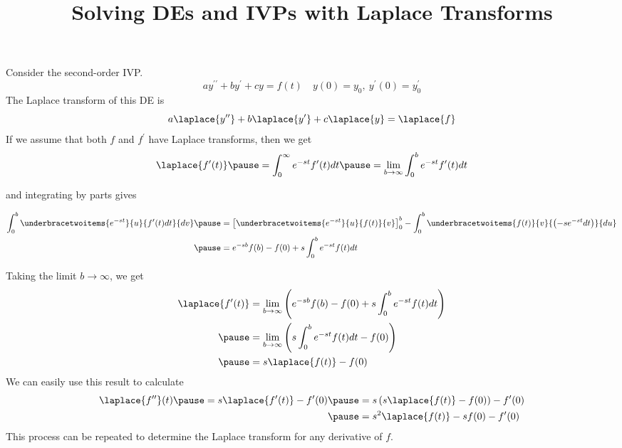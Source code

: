 \documentclass{beamer}
\title[MATH 2250 - Section 8.2]{Solving DEs and IVPs with Laplace Transforms}
\begin{document}
\begin{frame}
  \titlepage
\end{frame}

\begin{frame}
\begin{block}{}
Consider the second-order IVP\@.
\begin{equation*}
a y^{\prime\prime}+b y^{\prime}+c y=f(t)
\quad
y(0)=y_0,~y^{\prime}(0)=y^\prime_0
\end{equation*}\pause
The Laplace transform of this DE is
\begin{equation*}
a\laplace\{y^{\prime\prime}\}+b\laplace\{y^\prime\}+c\laplace\{y\}=\laplace\{f\}
\end{equation*}\pause
If we assume that both $f$ and $f^\prime$ have Laplace transforms, then we get
\begin{equation*}
\laplace\{f^\prime(t)\}\pause
=\int_0^\infty e^{-st} f^\prime(t) dt\pause
=\lim_{b\rightarrow\infty} \int_0^b e^{-st} f^\prime(t) dt
\end{equation*}\pause

\vspace{-4mm}
and integrating by parts gives

\vspace{-2mm}
\begin{equation*}
\begin{aligned}
\int_0^b \underbracetwoitems{e^{-st}}{u}{f^\prime(t) dt}{dv}\pause
&={\left[\underbracetwoitems{e^{-st}}{u}{f(t)}{v}\right]}^b_0
-\int_0^b\underbracetwoitems{f(t)}{v}{\left(-s e^{-st} dt\right)}{du}\\\pause
&=e^{-sb} f(b) - f(0) + s\int_0^b e^{-st} f(t) dt
\end{aligned}
\end{equation*}
\end{block}
\end{frame}

\begin{frame}
\begin{block}{}
Taking the limit $b \rightarrow \infty$, we get
\begin{equation*}
\begin{aligned}
\laplace\{f^\prime (t)\} &= \lim_{b\rightarrow\infty} \left(e^{-sb} f(b) - f(0) + s\int_0^b e^{-st} f(t) dt\right)\\\pause
&= \lim_{b\rightarrow\infty} \left(s\int_0^b e^{-st} f(t) dt-f(0)\right)\\\pause
&=s\laplace\{f(t)\}-f(0)
\end{aligned}
\end{equation*}\pause
We can easily use this result to calculate
\begin{equation*}
\begin{aligned}
\laplace\{f^{\prime\prime}\}(t)\pause
=s\laplace\{f^\prime (t)\}-f^\prime (0)\pause
&=s\left(s\laplace\{f(t)\}-f(0)\right)-f^\prime (0)\\\pause
&=s^2\laplace\{f(t)\} - sf(0) - f^\prime (0)
\end{aligned}
\end{equation*}\pause
This process can be repeated to determine the Laplace transform for any derivative of $f$.
\end{block}
\end{frame}
\end{document}
